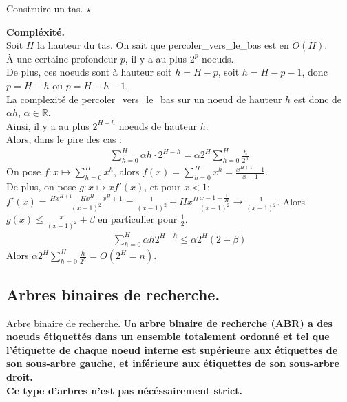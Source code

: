 \documentclass[french, 11pt]{article}
\begin{document}
\begin{defi}{Construire un tas. $\star$}{}
    \hspace*{0.2cm}\begin{algorithm}[H]
        \LinesNumbered
        \caption{Construire un tas}
    \end{algorithm}
    \textbf{Compléxité.}\\
    Soit $H$ la hauteur du tas. On sait que percoler\_vers\_le\_bas est en $O(H)$.\\
    À une certaine profondeur $p$, il y a au plus $2^p$ noeuds.\\
    De plus, ces noeuds sont à hauteur soit $h=H-p$, soit $h=H-p-1$, donc $p=H-h$ ou $p=H-h-1$.\\
    La complexité de percoler\_vers\_le\_bas sur un noeud de hauteur $h$ est donc de $\alpha h$, $\alpha\in\mathbb{R}$.\\
    Ainsi, il y a au plus $2^{H-h}$ noeuds de hauteur $h$.\\
    Alors, dans le pire des cas :
    \begin{align*}
        \sum_{h=0}^{H}{\alpha h\cdot2^{H-h}}=\alpha2^H\sum_{h=0}^{H}{\frac{h}{2^h}}
    \end{align*}
    On pose $f:x\mapsto\sum\limits_{h=0}^Hx^h$, alors $f(x)=\sum\limits_{h=0}^Hx^h=\frac{x^{H+1}-1}{x-1}$.\\
    De plus, on pose $g:x\mapsto xf'(x)$, et pour $x<1$: $f'(x)=\frac{Hx^{H+1}-Hx^{H}+x^{H}+1}{(x-1)^2}=\frac{1}{(x-1)^2}+Hx^H\frac{x - 1 - \frac{1}{H}}{(x-1)^2}\to\frac{1}{(x-1)^2}$.
    Alors $g(x)\leq\frac{x}{(x-1)^2}+\beta$ en particulier pour $\frac{1}{2}$.
    \begin{align*}
        \sum_{h=0}^H\alpha h 2^{H-h}\leq\alpha2^{H}(2+\beta)
    \end{align*}
    Alors $\alpha2^H\sum_{h=0}^H\frac{h}{2^h} = O(2^H = n)$.
\end{defi}

\vspace*{-0.9cm}

\subsection{Arbres binaires de recherche.}

\begin{defi}{Arbre binaire de recherche.}{}
    Un \bf{arbre binaire de recherche (ABR)} a des noeuds étiquettés dans un ensemble totalement ordonné et tel que l'étiquette de chaque noeud interne est supérieure aux étiquettes de son sous-arbre gauche, et inférieure aux étiquettes de son sous-arbre droit.\\
    Ce type d'arbres n'est pas nécéssairement strict.
\end{defi}
\end{document}
